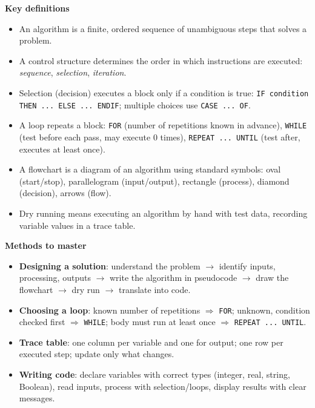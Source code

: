 \documentclass[11pt]{article}
\newcommand{\cle}[1]{{\popxbold\color{popdark}#1}}
\begin{document}
\begin{bilan}
\textbf{Key definitions}
\begin{itemize}
\item An \cle{algorithm} is a finite, ordered sequence of unambiguous steps that solves a problem.
\item A \cle{control structure} determines the order in which instructions are executed: \emph{sequence}, \emph{selection}, \emph{iteration}.
\item \cle{Selection} (decision) executes a block only if a condition is true: \texttt{IF condition THEN ... ELSE ... ENDIF}; multiple choices use \texttt{CASE ... OF}.
\item A \cle{loop} repeats a block: \texttt{FOR} (number of repetitions known in advance), \texttt{WHILE} (test before each pass, may execute 0 times), \texttt{REPEAT ... UNTIL} (test after, executes at least once).
\item A \cle{flowchart} is a diagram of an algorithm using standard symbols: oval (start/stop), parallelogram (input/output), rectangle (process), diamond (decision), arrows (flow).
\item \cle{Dry running} means executing an algorithm by hand with test data, recording variable values in a \cle{trace table}.
\end{itemize}

\textbf{Methods to master}
\begin{itemize}
\item \textbf{Designing a solution}: understand the problem $\rightarrow$ identify inputs, processing, outputs $\rightarrow$ write the algorithm in pseudocode $\rightarrow$ draw the flowchart $\rightarrow$ dry run $\rightarrow$ translate into code.
\item \textbf{Choosing a loop}: known number of repetitions $\Rightarrow$ \texttt{FOR}; unknown, condition checked first $\Rightarrow$ \texttt{WHILE}; body must run at least once $\Rightarrow$ \texttt{REPEAT ... UNTIL}.
\item \textbf{Trace table}: one column per variable and one for output; one row per executed step; update only what changes.
\item \textbf{Writing code}: declare variables with correct types (integer, real, string, Boolean), read inputs, process with selection/loops, display results with clear messages.
\end{itemize}


\end{bilan}
\end{document}
